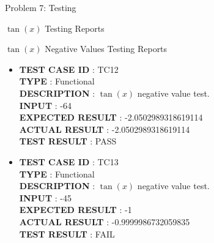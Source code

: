 \documentclass[a4paper,12pt]{article}
\begin{document}
\begin{section}{Problem 7: Testing}
\begin{subsubsection}{$\tan(x)$ Testing Reports}
\begin{itemize}
\end{itemize}
\end{subsubsection}

\vspace{1cm}

\begin{subsubsection}{$\tan(x)$ Negative Values Testing Reports}
\begin{itemize}
\item \textbf{TEST CASE ID} \hspace{1.25cm} : TC12  \\
\textbf{TYPE } \hspace{3.15cm}  : Functional\\
\textbf{DESCRIPTION }\hspace{1.25cm} : $\tan(x)$ negative value test. \\
\textbf{INPUT} \hspace{3.05cm} :  -64 \\
\textbf{EXPECTED RESULT} \hspace{0.01cm} : -2.0502989318619114  \\
\textbf{ACTUAL RESULT} \hspace{0.6cm} : -2.0502989318619114  \\
\textbf{TEST RESULT} \hspace{1.40cm} : PASS \\

\item \textbf{TEST CASE ID} \hspace{1.25cm} : TC13  \\
\textbf{TYPE } \hspace{3.15cm}  : Functional\\
\textbf{DESCRIPTION }\hspace{1.25cm} : $\tan(x)$ negative value test. \\
\textbf{INPUT} \hspace{3.05cm} :  -45 \\
\textbf{EXPECTED RESULT} \hspace{0.01cm} : -1 \\
\textbf{ACTUAL RESULT} \hspace{0.6cm} : -0.9999986732059835 \\
\textbf{TEST RESULT} \hspace{1.40cm} : FAIL \\	


\end{itemize}
\end{subsubsection}
\end{section}
\end{document}
